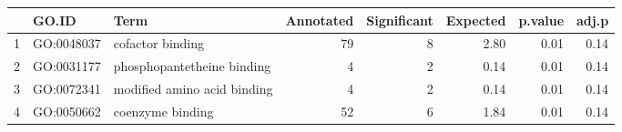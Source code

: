 \begin{table}[ht]
\centering
\begin{tabular}{rllrrrrr}
  \hline
 & GO.ID & Term & Annotated & Significant & Expected & p.value & adj.p \\ 
  \hline
1 & GO:0048037 & cofactor binding &  79 &   8 & 2.80 & 0.01 & 0.14 \\ 
  2 & GO:0031177 & phosphopantetheine binding &   4 &   2 & 0.14 & 0.01 & 0.14 \\ 
  3 & GO:0072341 & modified amino acid binding &   4 &   2 & 0.14 & 0.01 & 0.14 \\ 
  4 & GO:0050662 & coenzyme binding &  52 &   6 & 1.84 & 0.01 & 0.14 \\ 
   \hline
\end{tabular}
\end{table}
